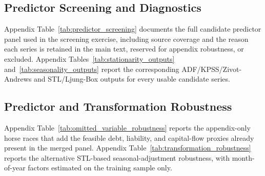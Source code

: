 \documentclass[12pt,a4paper]{article}
\begin{document}




\subsection{Predictor Screening and Diagnostics}

Appendix Table~\ref{tab:predictor_screening} documents the full candidate predictor panel used in the screening exercise, including source coverage and the reason each series is retained in the main text, reserved for appendix robustness, or excluded. Appendix Tables~\ref{tab:stationarity_outputs} and~\ref{tab:seasonality_outputs} report the corresponding ADF/KPSS/Zivot-Andrews and STL/Ljung-Box outputs for every usable candidate series.







\subsection{Predictor and Transformation Robustness}

Appendix Table~\ref{tab:omitted_variable_robustness} reports the appendix-only horse races that add the feasible debt, liability, and capital-flow proxies already present in the merged panel. Appendix Table~\ref{tab:transformation_robustness} reports the alternative STL-based seasonal-adjustment robustness, with month-of-year factors estimated on the training sample only.




\end{document}
